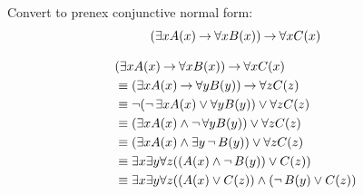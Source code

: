 \documentclass[addpoints]{exam}
\begin{document}
\begin{questions}


\question[5] Convert to prenex conjunctive normal form:
\[
(\exists x A(x) \mathbin{\rightarrow} \forall x B(x)) \mathbin{\rightarrow} \forall x C(x)
\]
\vspace{30mm}
\begin{solution}
\begin{align*}
&(\exists x A(x) \mathbin{\rightarrow} \forall x B(x)) \mathbin{\rightarrow} \forall x C(x)\\
& \equiv (\exists x A(x) \mathbin{\rightarrow} \forall y B(y)) \mathbin{\rightarrow} \forall z C(z)\\
& \equiv \mathop{\neg} (\mathop{\neg} \exists x A(x) \lor \forall y B(y)) \lor \forall z C(z)\\
& \equiv (\exists x A(x) \land \mathop{\neg} \forall y B(y)) \lor \forall z C(z)\\
& \equiv (\exists x A(x) \land \exists y \mathop{\neg} B(y)) \lor \forall z C(z)\\
& \equiv \exists x \exists y \forall z ((A(x) \land \mathop{\neg} B(y)) \lor C(z))\\
& \equiv \exists x \exists y \forall z ((A(x)\lor C(z)) \land (\mathop{\neg} B(y)\lor C(z))
\end{align*}

\end{solution}



\end{questions}
\end{document}
